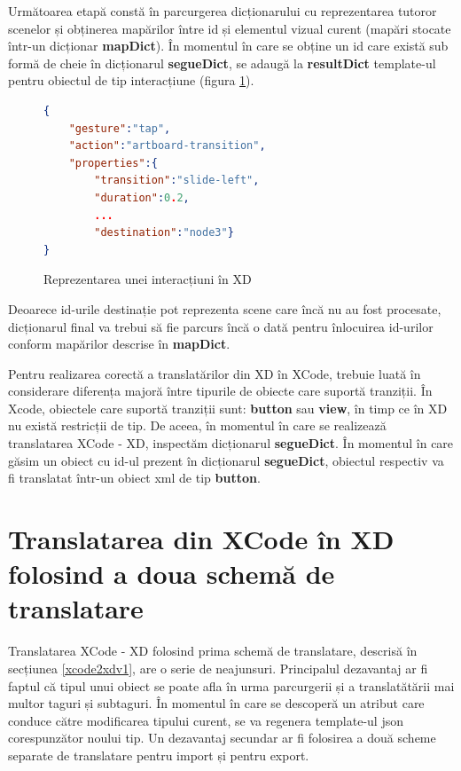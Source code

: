 Următoarea etapă constă în parcurgerea dicționarului cu reprezentarea tutoror scenelor și obținerea mapărilor între id și elementul vizual curent (mapări stocate într-un dicționar \textbf{mapDict}). În momentul în care se obține un id care există sub formă de cheie în dicționarul \textbf{segueDict}, se adaugă la \textbf{resultDict} template-ul pentru obiectul de tip interacțiune (figura \ref{fig:interactXD}).

\begin{figure}[!htbp]
\begin{lstlisting}[language=json,firstnumber=1]
{
    "gesture":"tap",
    "action":"artboard-transition",
    "properties":{
        "transition":"slide-left",
        "duration":0.2,
        ...
        "destination":"node3"}
} 
\end{lstlisting}
\caption{Reprezentarea unei interacțiuni în XD} \label{fig:interactXD}
\end{figure}

Deoarece id-urile destinație pot reprezenta scene care încă nu au fost procesate, dicționarul final va trebui să fie parcurs încă o dată pentru înlocuirea id-urilor conform mapărilor descrise în \textbf{mapDict}.

Pentru realizarea corectă a translatărilor din XD în XCode, trebuie luată în considerare diferența majoră între tipurile de obiecte care suportă tranziții. În Xcode, obiectele care suportă tranziții sunt: \textbf{button} sau \textbf{view}, în timp ce în XD nu există restricții de tip. De aceea, în momentul în care se realizează translatarea XCode - XD, inspectăm dicționarul \textbf{segueDict}. În momentul în care găsim un obiect cu id-ul prezent în dicționarul \textbf{segueDict}, obiectul respectiv va fi translatat într-un obiect xml de tip \textbf{button}.

\section {Translatarea din XCode în XD folosind a doua schemă de translatare} \label{xcxd2schema}

Translatarea XCode - XD folosind prima schemă de translatare, descrisă în secțiunea \ref{xcode2xdv1}, are o serie de neajunsuri. Principalul dezavantaj ar fi faptul că tipul unui obiect se poate afla în urma parcurgerii și a translatătării mai multor taguri și subtaguri. În momentul în care se descoperă un atribut care conduce către modificarea tipului curent, se va regenera template-ul json corespunzător noului tip.  
Un dezavantaj secundar ar fi folosirea a două scheme separate de translatare pentru import și pentru export.

